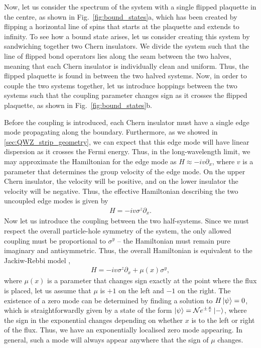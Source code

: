 Now, let us consider the spectrum of the system with a single flipped plaquette in the centre, as shown in Fig.~\ref{fig:bound_states}a, which has been created by flipping a horizontal line of spins that starts at the plaquette and extends to infinity. To see how a bound state arises, let us consider creating this system by sandwiching together two Chern insulators. We divide the system such that the line of flipped bond operators lies along the seam between the two halves, meaning that each Chern insulator is individually clean and uniform. Thus, the flipped plaquette is found in between the two halved systems. Now, in order to couple the two systems together, let us introduce hoppings between the two systems such that the coupling parameter changes sign as it crosses the flipped plaquette, as shown in Fig.~\ref{fig:bound_states}b. 

Before the coupling is introduced, each Chern insulator must have a single edge mode propagating along the boundary. Furthermore, as we showed in \textsection\ref{sec:QWZ_strip_geometry}, we can expect that this edge mode will have linear dispersion as it crosses the Fermi energy. Thus, in the long-wavelength limit, we may approximate the Hamiltonian for the edge mode as $H \approx -iv\partial_x$, where $v$ is a parameter that determines the group velocity of the edge mode. On the upper Chern insulator, the velocity will be positive, and on the lower insulator the velocity will be negative. Thus, the effective Hamiltonian describing the two uncoupled edge modes is given by
\begin{align}
    H = -iv\sigma^z\partial_x.
\end{align}
Now let us introduce the coupling between the two half-systems. Since we must respect the overall particle-hole symmetry of the system, the only allowed coupling must be proportional to $\sigma^y$ -- the Hamiltonian must remain pure imaginary and antisymmetric. Thus, the overall Hamiltonian is equivalent to the Jackiw-Rebbi model \cite{jackiw_solitons_1976},
\begin{align}
    H = -iv\sigma^z\partial_x + \mu(x) \sigma^y,
\end{align}
where $\mu(x)$ is a parameter that changes sign exactly at the point where the flux is placed, let us assume that $\mu$ is $+1$ on the left and $-1$ on the right. The existence of a zero mode can be determined by finding a solution to $H \ket \psi = 0$, which is straightforwardly given by a state of the form $\ket \psi = \mathcal N e^{\pm \frac x v} \ket - $, where the sign in the exponential changes depending on whether $x$ is to the left or right of the flux. Thus, we have an exponentially localised zero mode appearing. In general, such a mode will always appear anywhere that the sign of $\mu$ changes. 

